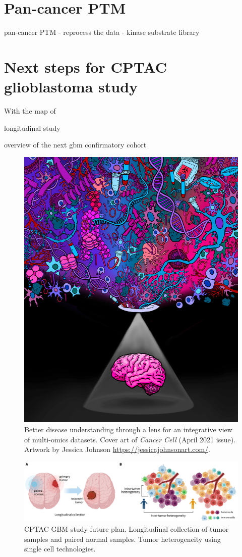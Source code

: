 \section{Pan-cancer PTM}
pan-cancer PTM
- reprocess the data
- kinase substrate library


\section{Next steps for CPTAC glioblastoma study}
With the map of 

longitudinal study

overview of the next gbm confirmatory cohort

\begin{figure}[tb]
    \centering
    \includegraphics[width=0.6\linewidth]{figures/chap05_conclusion/cptac_gbm_cancer_cell_cover.png}
    \caption[Better disease understanding through a lens for an integrative view of multi-omics datasets.]{Better disease understanding through a lens for an integrative view of multi-omics datasets. Cover art of \textit{Cancer Cell} (April 2021 issue). Artwork by Jessica Johnson \url{https://jessicajohnsonart.com/}.}
    \label{fig:lens-multi-omics}
\end{figure}

\begin{figure}[tb]
    \centering
    \includegraphics[width=1\linewidth]{figures/chap05_conclusion/gbm_future_plan.pdf}
    \caption[CPTAC GBM study future plan.]{%
        CPTAC GBM study future plan.
         Longitudinal collection of tumor samples and paired normal samples.
         Tumor heterogeneity using single cell technologies.
    }
    \label{fig:cptac-gbm-future-plan}
\end{figure}
